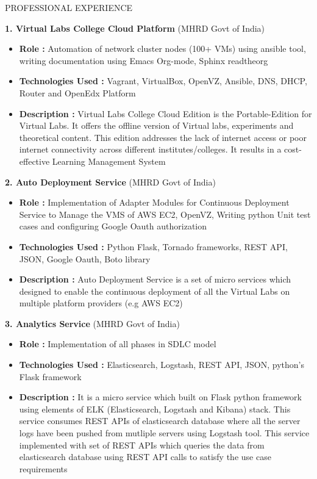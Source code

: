 \documentclass{resume} %
\begin{document}
\begin{rSection}{PROFESSIONAL EXPERIENCE}
\begin{rSubsection}
\textbf {1. Virtual Labs College Cloud Platform} (MHRD Govt of India) 
\begin{itemize}
\item \textbf{Role : } Automation of network cluster nodes (100+
VMs) using ansible tool, writing documentation using Emacs Org-mode,
Sphinx readtheorg
\item \textbf{Technologies
  Used :} Vagrant, VirtualBox, OpenVZ, Ansible, DNS, DHCP, Router and
  OpenEdx Platform
\item  \textbf{Description :} Virtual Labs College Cloud
Edition is the Portable-Edition for Virtual Labs. It offers the
offline version of Virtual labs, experiments and theoretical
content. This edition addresses the lack of internet access or poor
internet connectivity across different institutes/colleges. It results
in a cost-effective Learning Management System
\end{itemize}

\bigskip

\textbf{2. Auto Deployment Service} (MHRD Govt of India)
\begin{itemize}
\item
\textbf{Role : }
Implementation of Adapter Modules for Continuous Deployment Service to
Manage the VMS of AWS EC2, OpenVZ, Writing python Unit test cases and
configuring Google Oauth authorization
\item \textbf{Technologies Used :} Python Flask, Tornado frameworks, REST
  API, JSON, Google Oauth, Boto library
\item \textbf{Description :} Auto
Deployment Service is a set of micro services which designed to enable
the continuous deployment of all the Virtual Labs on multiple platform
providers (e.g AWS EC2)
\end{itemize}
\bigskip
\textbf{3. Analytics Service} (MHRD Govt of India)
\begin{itemize}

\item \textbf{Role : } Implementation of all phases in SDLC model
\item \textbf{Technologies Used :} Elasticsearch, Logstash, REST API,
  JSON, python's Flask framework
\item \textbf{Description :} It is a micro
service which built on Flask python framework using elements of ELK
(Elasticsearch, Logstash and Kibana) stack. This service consumes REST
APIs of elasticsearch database where all the server logs have been
pushed from mutliple servers using Logstash tool. This service
implemented with set of REST APIs which queries the data from
elasticsearch database using REST API calls to satisfy the use case
requirements
\end{itemize}


\end{rSubsection}
\end{rSection}
\end{document}
